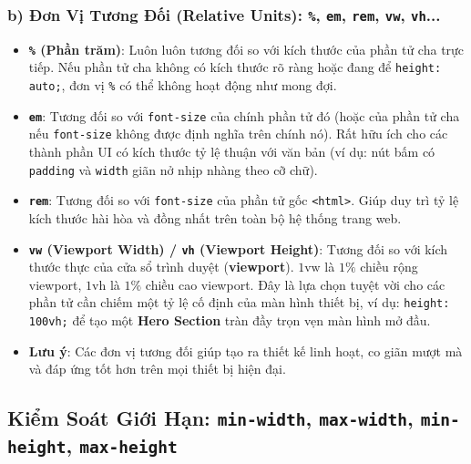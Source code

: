 \documentclass[11pt,oneside]{book}
\newcommand{\codeinline}[1]{\textcolor{accentOrange}{\texttt{#1}}}
\newcommand{\term}[1]{\textbf{\textcolor{primaryBlue}{#1}}}
\DeclareRobustCommand{\csshint}[1]{\texorpdfstring{\textcolor{accentOrange}{\textbf{\texttt{#1}}}}{#1}}
\begin{document}
\subsubsection{b) Đơn Vị Tương Đối (Relative Units): \csshint{\%}, \csshint{em}, \csshint{rem}, \csshint{vw}, \csshint{vh}...}
\begin{itemize}[leftmargin=1.5em, itemsep=4pt, parsep=0pt]
    \item \textbf{\codeinline{\%} (Phần trăm)}: Luôn luôn tương đối so với kích thước của phần tử cha trực tiếp. Nếu phần tử cha không có kích thước rõ ràng hoặc đang để \codeinline{height: auto;}, đơn vị \codeinline{\%} có thể không hoạt động như mong đợi.
    \item \textbf{\codeinline{em}}: Tương đối so với \codeinline{font-size} của chính phần tử đó (hoặc của phần tử cha nếu \codeinline{font-size} không được định nghĩa trên chính nó). Rất hữu ích cho các thành phần UI có kích thước tỷ lệ thuận với văn bản (ví dụ: nút bấm có \codeinline{padding} và \codeinline{width} giãn nở nhịp nhàng theo cỡ chữ).
    \item \textbf{\codeinline{rem}}: Tương đối so với \codeinline{font-size} của phần tử gốc \codeinline{<html>}. Giúp duy trì tỷ lệ kích thước hài hòa và đồng nhất trên toàn bộ hệ thống trang web.
    \item \textbf{\codeinline{vw} (\term{Viewport Width}) / \codeinline{vh} (\term{Viewport Height})}: Tương đối so với kích thước thực của cửa sổ trình duyệt (\term{viewport}). $1\text{vw}$ là $1\%$ chiều rộng viewport, $1\text{vh}$ là $1\%$ chiều cao viewport. Đây là lựa chọn tuyệt vời cho các phần tử cần chiếm một tỷ lệ cố định của màn hình thiết bị, ví dụ: \codeinline{height: 100vh;} để tạo một \term{Hero Section} tràn đầy trọn vẹn màn hình mở đầu.
    \item \textbf{Lưu ý}: Các đơn vị tương đối giúp tạo ra thiết kế linh hoạt, co giãn mượt mà và đáp ứng tốt hơn trên mọi thiết bị hiện đại.
\end{itemize}

\subsection{Kiểm Soát Giới Hạn: \csshint{min-width}, \csshint{max-width}, \csshint{min-height}, \csshint{max-height}}
\label{subsec:min_max_sizing}
\end{document}
